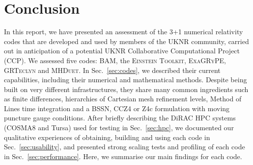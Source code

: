 \documentclass[12pt,a4paper]{article}
\numberwithin{figure}{subsection}
\newcommand{\bam}{\textsc{BAM}\xspace}
\newcommand{\einsteintoolkit}{\textsc{Einstein Toolkit}\xspace}
\newcommand{\exagrype}{\textsc{ExaGRyPE}\xspace}
\newcommand{\grteclyn}{\textsc{GRTeclyn}\xspace}
\newcommand{\mhduet}{\textsc{MHDuet}\xspace}
\begin{document}
\section{Conclusion}
\label{sec:conclusion}

In this report, we have presented an assessment of the 3+1 numerical
relativity codes that are developed and used by members of the UKNR
community, carried out in anticipation of a potential UKNR Collaborative
Computational Project (CCP). We assessed five codes: \bam, the
\einsteintoolkit, \exagrype, \grteclyn and \mhduet. In Sec.~\ref{sec:codes},
we described their current capabilities, including their numerical and
mathematical methods. Despite being built on very different infrastructures,
they share many common ingredients such as finite differences, hierarchies of
Cartesian mesh refinement levels, Method of Lines time integration and a
BSSN, CCZ4 or Z4c formulation with moving puncture gauge conditions. After
briefly describing the DiRAC HPC systems (COSMA8 and Tursa) used for testing
in Sec.~\ref{sec:hpc}, we documented our qualitative experiences of
obtaining, building and using each code in Sec.~\ref{sec:usability}, and
presented strong scaling tests and profiling of each code in
Sec.~\ref{sec:performance}. Here, we summarise our main findings for each
code.
\end{document}

